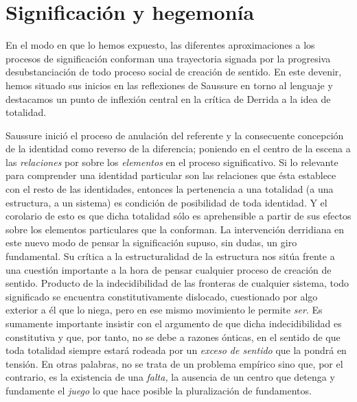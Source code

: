 \section{Significación y hegemonía}

En el modo en que lo hemos expuesto, las diferentes aproximaciones a los procesos de significación conforman una trayectoria signada por la progresiva desubstanciación de todo proceso social de creación de sentido. En este devenir, hemos situado sus inicios en las reflexiones de Saussure en torno al lenguaje y destacamos un punto de inflexión central en la crítica de Derrida a la idea de totalidad.

Saussure inició el proceso de anulación del referente y la consecuente concepción de la identidad como reverso de la diferencia; poniendo en el centro de la escena a las \emph{relaciones} por sobre los \emph{elementos} en el proceso significativo. Si lo relevante para comprender una identidad particular son las relaciones que ésta establece con el resto de las identidades, entonces la pertenencia a una totalidad (a una estructura, a un sistema) es condición de posibilidad de toda identidad. Y el corolario de esto es que dicha totalidad sólo es aprehensible a partir de sus efectos sobre los elementos particulares que la conforman. La intervención derridiana en este nuevo modo de pensar la significación supuso, sin dudas, un giro fundamental. Su crítica a la estructuralidad de la estructura nos sitúa frente a una cuestión importante a la hora de pensar cualquier proceso de creación de sentido. Producto de la indecidibilidad de las fronteras de cualquier sistema, todo significado se encuentra constitutivamente dislocado, cuestionado por algo exterior a él que lo niega, pero en ese mismo movimiento le permite \emph{ser}. Es sumamente importante insistir con el argumento de que dicha indecidibilidad es constitutiva y que, por tanto, no se debe a razones ónticas, en el sentido de que toda totalidad siempre estará rodeada por un \emph{exceso de sentido} que la pondrá en tensión. En otras palabras, no se trata de un problema empírico sino que, por el contrario, es la existencia de una \emph{falta,} la ausencia de un centro que detenga y fundamente el \emph{juego} lo que hace posible la pluralización de fundamentos.

